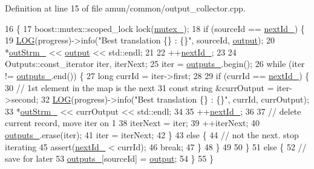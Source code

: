 Definition at line 15 of file amun/common/output\+\_\+collector.\+cpp.


\begin{DoxyCode}
16 \{
17   boost::mutex::scoped\_lock lock(\hyperlink{classamunmt_1_1OutputCollector_a817d2d503109791aec798ea340d0dcbe}{mutex\_});
18   \textcolor{keywordflow}{if} (sourceId == \hyperlink{classamunmt_1_1OutputCollector_a32c7f6ee98058aa27f17e1816364fc2e}{nextId\_}) \{
19     \hyperlink{amun_2common_2logging_8h_a8cad147aca8c526d3c8a03ae14d5c87d}{LOG}(progress)->info(\textcolor{stringliteral}{"Best translation \{\} : \{\}"}, sourceId, \hyperlink{namespacetest_a07b64f21658cf1faa97a31563ac979d2}{output});
20     *\hyperlink{classamunmt_1_1OutputCollector_a77a2c3b366592e7bcebcdd167fccf28b}{outStrm\_} << \hyperlink{namespacetest_a07b64f21658cf1faa97a31563ac979d2}{output} << std::endl;
21     
22     ++\hyperlink{classamunmt_1_1OutputCollector_a32c7f6ee98058aa27f17e1816364fc2e}{nextId\_};
23 
24     Outputs::const\_iterator iter, iterNext;
25     iter = \hyperlink{classamunmt_1_1OutputCollector_ac945f2d433081e2fc89f2915d46d1c20}{outputs\_}.begin();
26     \textcolor{keywordflow}{while} (iter != \hyperlink{classamunmt_1_1OutputCollector_ac945f2d433081e2fc89f2915d46d1c20}{outputs\_}.end()) \{
27       \textcolor{keywordtype}{long} currId = iter->first;
28 
29       \textcolor{keywordflow}{if} (currId == \hyperlink{classamunmt_1_1OutputCollector_a32c7f6ee98058aa27f17e1816364fc2e}{nextId\_}) \{
30         \textcolor{comment}{// 1st element in the map is the next}
31         \textcolor{keyword}{const} \textcolor{keywordtype}{string} &currOutput = iter->second;
32         \hyperlink{amun_2common_2logging_8h_a8cad147aca8c526d3c8a03ae14d5c87d}{LOG}(progress)->info(\textcolor{stringliteral}{"Best translation \{\} : \{\}"}, currId, currOutput);
33         *\hyperlink{classamunmt_1_1OutputCollector_a77a2c3b366592e7bcebcdd167fccf28b}{outStrm\_} << currOutput << std::endl;
34 
35         ++\hyperlink{classamunmt_1_1OutputCollector_a32c7f6ee98058aa27f17e1816364fc2e}{nextId\_};
36 
37         \textcolor{comment}{// delete current record, move iter on 1}
38         iterNext = iter;
39         ++iterNext;
40         \hyperlink{classamunmt_1_1OutputCollector_ac945f2d433081e2fc89f2915d46d1c20}{outputs\_}.erase(iter);
41         iter = iterNext;
42       \}
43       \textcolor{keywordflow}{else} \{
44         \textcolor{comment}{// not the next. stop iterating}
45         assert(\hyperlink{classamunmt_1_1OutputCollector_a32c7f6ee98058aa27f17e1816364fc2e}{nextId\_} < currId);
46         \textcolor{keywordflow}{break};
47       \}
48     \}
49 
50   \}
51   \textcolor{keywordflow}{else} \{
52     \textcolor{comment}{// save for later}
53     \hyperlink{classamunmt_1_1OutputCollector_ac945f2d433081e2fc89f2915d46d1c20}{outputs\_}[sourceId] = \hyperlink{namespacetest_a07b64f21658cf1faa97a31563ac979d2}{output};
54   \}
55 \}
\end{DoxyCode}


